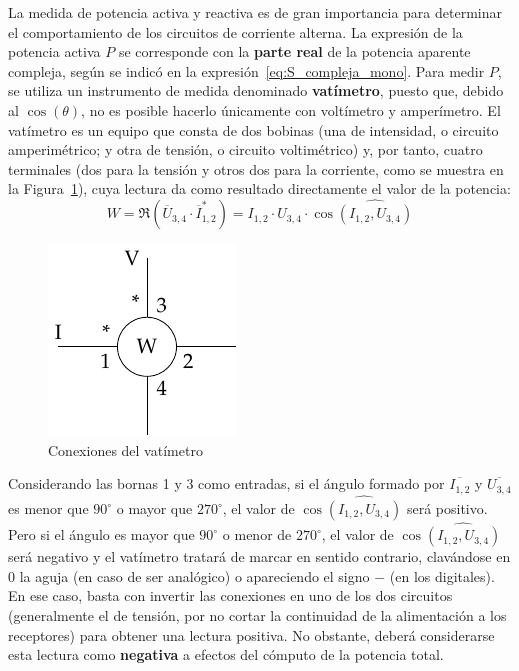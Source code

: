 La medida de potencia activa y reactiva es de gran importancia para
determinar el comportamiento de los circuitos de corriente alterna. La
expresión de la potencia activa $P$ se corresponde con la
\textbf{parte real} de la potencia aparente compleja, según se indicó
en la expresión~\eqref{eq:S_compleja_mono}. Para medir $P$, se utiliza
un instrumento de medida denominado \textbf{vatímetro}, puesto que,
debido al $\cos(\theta)$, no es posible hacerlo únicamente con
voltímetro y amperímetro. El vatímetro es un equipo que consta de dos
bobinas (una de intensidad, o circuito amperimétrico; y otra de
tensión, o circuito voltimétrico) y, por tanto, cuatro terminales (dos
para la tensión y otros dos para la corriente, como se muestra en la
Figura~\ref{fig:vatimetro_2}), cuya lectura da como resultado
directamente el valor de la potencia:
\begin{equation*}
  W=\Re(\overline{U}_{3,4} \cdot \overline{I}_{1,2}^*)=I_{1,2}\cdot U_{3,4}\cdot \cos\widehat{(I_{1,2}, U_{3,4})}
\end{equation*}%
	
\begin{figure}[H]
  \centering \includegraphics{../figs/vatimetro_2.pdf}
  \caption{Conexiones del vatímetro}
  \label{fig:vatimetro_2}
\end{figure}
Considerando las bornas 1 y 3 como entradas, si el ángulo formado por
$\overline{I_{1,2}}$ y $\overline{U_{3,4}}$ es menor que $90^\circ$ o
mayor que $270^\circ$, el valor de $\cos\widehat{(I_{1,2}, U_{3,4})}$
será positivo. Pero si el ángulo es mayor que $90^\circ$ o menor de
$270^\circ$, el valor de $\cos\widehat{(I_{1,2}, U_{3,4})}$ será
negativo y el vatímetro tratará de marcar en sentido contrario,
clavándose en $0$ la aguja (en caso de ser analógico) o apareciendo el
signo $-$ (en los digitales). En ese caso, basta con invertir las
conexiones en uno de los dos circuitos (generalmente el de tensión,
por no cortar la continuidad de la alimentación a los receptores) para
obtener una lectura positiva. No obstante, deberá considerarse esta
lectura como \textbf{negativa} a efectos del cómputo de la potencia
total.
	
